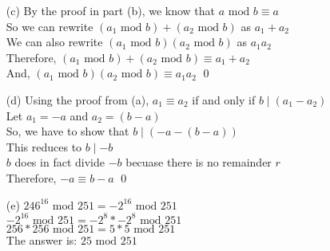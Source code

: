 \documentclass[11pt]{article}
\theoremstyle{definition}
\begin{document}
\begin{enumerate}
	\item[(c)]
	By the proof in part (b), we know that $a \text{ mod } b \equiv a$\\
	So we can rewrite $(a_1 \text{ mod } b) + (a_2 \text { mod } b)$ as $a_1 + a _2$\\
	We can also rewrite $(a_1 \text{ mod } b)(a_2 \text{ mod } b)$ as $a_1a_2$\\
	Therefore, $(a_1 \text{ mod } b) + (a_2 \text { mod } b) \equiv a_1 + a_2$\\
	And, $(a_1 \text{ mod } b)(a_2 \text{ mod } b) \equiv a_1a_2$ \qed

	\item[(d)]
	Using the proof from (a), $a_1 \equiv a_2$ if and only if $b \mid (a_1 - a_2)$\\
	Let $a_1 = -a$ and $a_2 = (b - a)$\\
	So, we have to show that $b \mid (-a - (b - a))$\\
	This reduces to $b \mid -b$\\
	$b$ does in fact divide $-b$ becuase there is no remainder $r$\\
	Therefore, $-a \equiv b - a$ \qed

	\item[(e)]
	$246^{16} \text{ mod } 251 = -2^{16} \text{ mod } 251$\\
	$-2^{16} \text{ mod } 251 = -2^{8} * -2^{8} \text{ mod } 251$\\
	$256 * 256 \text{ mod } 251 = 5 * 5 \text{ mod } 251$\\
	The answer is: $25 \text{ mod } 251$
\end{enumerate}
\end{document}
